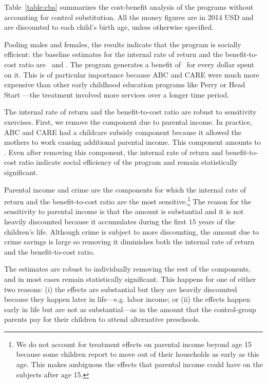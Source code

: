 Table~\ref{table:cba} summarizes the cost-benefit analysis of the programs without accounting for control substitution. All the money figures are in 2014 USD and are discounted to each child's birth age, unless otherwise specified.

Pooling males and females, the results indicate that the program is socially efficient: the baseline estimates for the internal rate of return and the benefit-to-cost ratio are \irrp\ and \bcp. The program generates a benefit of \bcp\ for every dollar spent on it. This is of particular importance because ABC and CARE were much more expensive than other early childhood education programs like Perry or Head Start \citep{Elango_Hojman_etal_2016_Early-Edu}---the treatment involved more services over a longer time period.

The internal rate of return and the benefit-to-cost ratio are robust to sensitivity exercises. First, we remove the component due to parental income. In practice, ABC and CARE had a childcare subsidy component because it allowed the mothers to work causing additional parental income. This component amounts to \parincomenpvp. Even after removing this component, the internal rate of return and benefit-to-cost ratio indicate social efficiency of the program and remain statistically significant.

Parental income and crime are the components for which the internal rate of return and the benefit-to-cost ratio are the most sensitive.\footnote{We do not account for treatment effects on parental income beyond age 15 because some children report to move out of their households as early as this age. This makes ambiguous the effects that parental income could have on the subjects after age 15.} The reason for the sensitivity to parental income is that the amount is substantial and it is not heavily discounted because it accumulates during the first $15$ years of the children's life. Although crime is subject to more discounting, the amount due to crime savings is large so removing it diminishes both the internal rate of return and the benefit-to-cost ratio.

The estimates are robust to individually removing the rest of the components, and in most cases remain statistically significant. This happens for one of either two reasons: (i) the effects are substantial but they are heavily discounted because they happen later in life---e.g. labor income; or (ii) the effects happen early in life but are not as substantial---as in the amount that the control-group parents pay for their children to attend alternative preschools.

